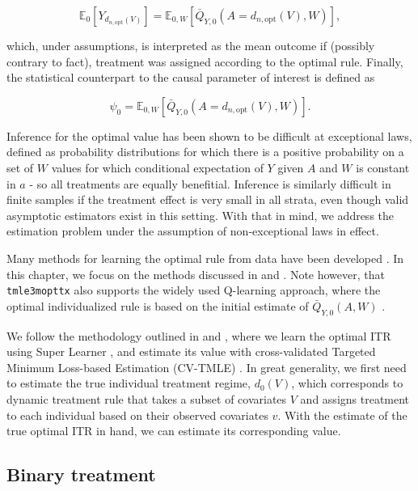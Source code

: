\documentclass[
  12pt, krantz2,
]{krantz}
\newcommand{\passthrough}[1]{#1}
\newcommand{\E}{\mathbb{E}}
\newcommand{\1}{\mathbbm{1}}
\theoremstyle{definition}
\theoremstyle{definition}
\theoremstyle{definition}
\theoremstyle{definition}
\theoremstyle{remark}
\begin{document}
\[\E_0[Y_{d_{n, \text{opt}}(V)}] = \E_{0,W}[\bar{Q}_{Y,0}(A=d_{n, \text{opt}}(V),W)],\]

which, under assumptions, is interpreted as the mean outcome if
(possibly contrary to fact), treatment was assigned according to the optimal rule.
Finally, the statistical counterpart to the causal parameter of interest is
defined as

\[\psi_0 = \E_{0,W}[\bar{Q}_{Y,0}(A=d_{n,\text{opt}}(V),W)].\]

Inference for the optimal value has been shown to be difficult at exceptional
laws, defined as probability distributions for which there is a positive
probability on a set of \(W\) values for which conditional expectation of \(Y\)
given \(A\) and \(W\) is constant in \(a\) - so all treatments are equally
benefitial. Inference is similarly difficult in finite samples if
the treatment effect is very small in all strata, even though valid asymptotic
estimators exist in this setting. With that in mind, we address the estimation
problem under the assumption of non-exceptional laws in effect.

Many methods for learning the optimal rule from data have been developed
\citep{murphy2003, robins2004, laber2012, kosorok2012, moodie2013}. In this
chapter, we focus on the methods discussed in \citet{luedtke2016super} and
\citet{vanderLaanLuedtke15}. Note however, that \passthrough{\lstinline!tmle3mopttx!} also supports the widely
used Q-learning approach, where the optimal individualized rule is based on the
initial estimate of \(\bar{Q}_{Y,0}(A,W)\) \citep{Sutton1998}.

We follow the methodology outlined in \citet{luedtke2016super} and
\citet{vanderLaanLuedtke15}, where we learn the optimal ITR using Super Learner
\citep{vdl2007super}, and estimate its value with cross-validated Targeted Minimum
Loss-based Estimation (CV-TMLE) \citep{cvtmle2010}. In great generality, we first
need to estimate the true individual treatment regime, \(d_0(V)\), which
corresponds to dynamic treatment rule that takes a subset of covariates
\(V\) and assigns treatment to each individual based on their observed
covariates \(v\). With the estimate of the true optimal ITR in hand, we can
estimate its corresponding value.

\hypertarget{binary-treatment}{%
\subsection{Binary treatment}\label{binary-treatment}}
\end{document}

